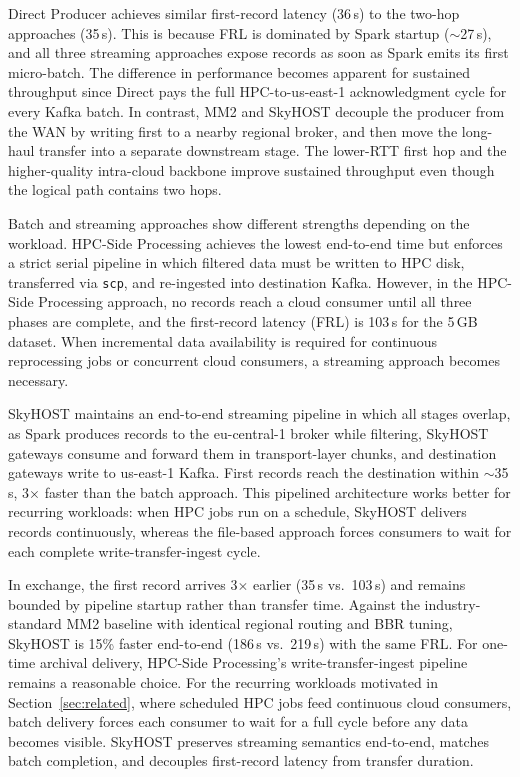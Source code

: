 \documentclass[runningheads]{llncs}
\begin{document}
Direct Producer achieves similar first-record latency (36\,s) to the two-hop approaches (35\,s). This is because FRL is dominated by Spark startup ($\sim$27\,s), and all three streaming approaches expose records as soon as Spark emits its first micro-batch. The difference in performance becomes apparent for sustained throughput since Direct pays the full HPC-to-us-east-1 acknowledgment cycle for every Kafka batch. In contrast, MM2 and SkyHOST decouple the producer from the WAN by writing first to a nearby regional broker, and then move the long-haul transfer into a separate downstream stage. The lower-RTT first hop and the higher-quality intra-cloud backbone improve sustained throughput even though the logical path contains two hops.


Batch and streaming approaches show different strengths depending on the workload. HPC-Side Processing achieves the lowest end-to-end time but enforces a strict serial pipeline in which filtered data must be written to HPC disk, transferred via \texttt{scp}, and re-ingested into destination Kafka. However, in the HPC-Side Processing approach, no records reach a cloud consumer until all three phases are complete, and the first-record latency (FRL) is 103\,s for the 5\,GB dataset. When incremental data availability is required for continuous reprocessing jobs or concurrent cloud consumers, a streaming approach becomes necessary.

SkyHOST maintains an end-to-end streaming pipeline in which all stages overlap, as Spark produces records to the eu-central-1 broker while filtering, SkyHOST gateways consume and forward them in transport-layer chunks, and destination gateways write to us-east-1 Kafka. First records reach the destination within $\sim$35\,s, 3$\times$ faster than the batch approach. This pipelined architecture works better for recurring workloads: when HPC jobs run on a schedule, SkyHOST delivers records continuously, whereas the file-based approach forces consumers to wait for each complete write-transfer-ingest cycle. 

In exchange, the first record arrives 3$\times$ earlier (35\,s vs.\ 103\,s) and remains bounded by pipeline startup rather than transfer time. Against the industry-standard MM2 baseline with identical regional routing and BBR tuning, SkyHOST is 15\% faster end-to-end (186\,s vs.\ 219\,s) with the same FRL. For one-time archival delivery, HPC-Side Processing's write-transfer-ingest pipeline remains a reasonable choice. For the recurring workloads motivated in Section~\ref{sec:related}, where scheduled HPC jobs feed continuous cloud consumers, batch delivery forces each consumer to wait for a full cycle before any data becomes visible. SkyHOST preserves streaming semantics end-to-end, matches batch completion, and decouples first-record latency from transfer duration.
\end{document}
